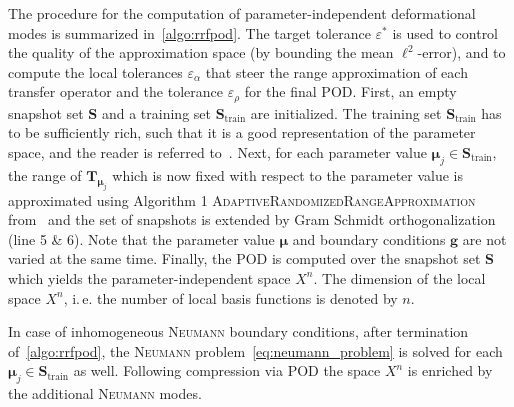 \documentclass[a4paper]{eccomas_paper-2024}
\makeatletter
\newcommand{\ie}{i.\,e.\@\xspace}
\newcommand{\m}{\bm\mu}
\makeatother
\begin{document}
The procedure for the computation of parameter-independent deformational modes is summarized in~\cref{algo:rrfpod}.
The target tolerance $\varepsilon^{\ast}$ is used to control the quality of the approximation space (by bounding the mean $\ell^2$-error), and to compute the local tolerances $\varepsilon_{\alpha}$ that steer the range approximation of each transfer operator and the tolerance $\varepsilon_{\rho}$ for the final POD.
First, an empty snapshot set $\bm{S}$ and a training set $\bm{S}_{\mathrm{train}}$ are initialized.
The training set $\bm{S}_{\mathrm{train}}$ has to be sufficiently rich, such that it is a good representation of the parameter space, and the reader is referred to~\cite{Haasdonk2017Chapter}.
Next, for each parameter value $\m_j\in\bm{S}_{\mathrm{train}}$, the range of $\bm{T}_{\m_j}$ which is now fixed with respect to the parameter value is approximated using Algorithm 1 \textsc{AdaptiveRandomizedRangeApproximation} from~\cite{Buhr2018Randomized} and the set of snapshots is extended by Gram Schmidt orthogonalization (line 5 \& 6).
Note that the parameter value $\m$ and boundary conditions $\bm{g}$ are not varied at the same time.
Finally, the POD is computed over the snapshot set $\bm{S}$ which yields the parameter-independent space $X^n$.
The dimension of the local space $X^n$, \ie{} the number of local basis functions is denoted by $n$.

In case of inhomogeneous \textsc{Neumann} boundary conditions, after termination of~\cref{algo:rrfpod}, the \textsc{Neumann} problem~\cref{eq:neumann_problem} is solved for each $\m_j\in\bm{S}_{\mathrm{train}}$ as well.
Following compression via POD the space $X^n$ is enriched by the additional \textsc{Neumann} modes.
\end{document}

